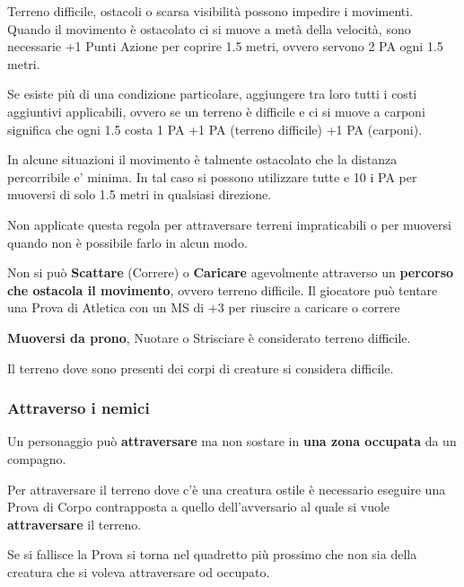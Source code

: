 \documentclass[12pt,a4paper,twoside,openany]{book}
\begin{document}
\begin{multicols}{2}
Terreno difficile, ostacoli o scarsa visibilità possono impedire i movimenti. Quando il movimento è ostacolato ci si muove a metà della velocità, sono necessarie +1 Punti Azione per coprire 1.5 metri, ovvero servono 2 PA ogni 1.5 metri.

Se esiste più di una condizione particolare, aggiungere tra loro tutti i costi aggiuntivi applicabili, ovvero se un terreno è difficile e ci si muove a carponi significa che ogni 1.5 costa 1 PA +1 PA (terreno difficile) +1 PA (carponi).

In alcune situazioni il movimento è talmente ostacolato che la distanza percorribile e' minima. In tal caso si possono utilizzare tutte e 10 i PA per muoversi di solo 1.5 metri in qualsiasi direzione.

Non applicate questa regola per attraversare terreni impraticabili o per muoversi quando non è possibile farlo in alcun modo.

Non si può \textbf{Scattare} (Correre) o \textbf{Caricare}  agevolmente attraverso un \textbf{percorso che ostacola il movimento}, ovvero terreno difficile. Il giocatore può tentare una Prova di Atletica con un MS di +3 per riuscire a caricare o correre

\textbf{Muoversi da prono}, Nuotare o Strisciare è considerato terreno difficile.

Il terreno dove sono presenti dei corpi di creature si considera difficile.

\subsubsection{Attraverso i nemici}\label{attraversonemici}

Un personaggio può \textbf{attraversare} ma non sostare in \textbf{una zona occupata} da un compagno.

Per attraversare il terreno dove c'è una creatura ostile è necessario eseguire una Prova di Corpo contrapposta a quello dell'avversario al quale si vuole \textbf{attraversare} il terreno.

Se si fallisce la Prova si torna nel quadretto più prossimo che non sia della creatura che si voleva attraversare od occupato.


\end{multicols}
\end{document}
